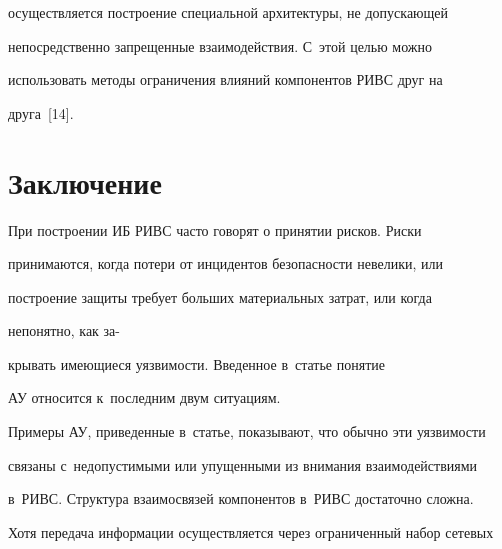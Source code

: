 осуществляется построение специальной архитектуры, не допускающей 


непосредственно запрещенные взаимодействия. С~этой целью можно 


использовать методы ограничения влияний компонентов РИВС друг на 


друга~[14].





\vspace*{-4pt}


  


\section{Заключение}





\vspace*{-2pt}





  При построении ИБ РИВС часто говорят о принятии рисков. Риски 


принимаются, когда потери от инцидентов безопасности невелики, или 


построение защиты требует больших материальных затрат, или когда 


непонятно, как за-\linebreak\vspace*{-12pt}





\pagebreak





\noindent


крывать имеющиеся уязвимости. Введенное в~статье понятие 


АУ относится к~последним двум ситуациям. 


  


  Примеры АУ, приведенные в~статье, показывают, что обычно эти уязвимости 


связаны с~недопустимыми или упущенными из внимания взаимодействиями 


в~РИВС. Структура взаимосвязей компонентов в~РИВС достаточно сложна. 


Хотя передача информации осуществляется через ограниченный набор сетевых 


